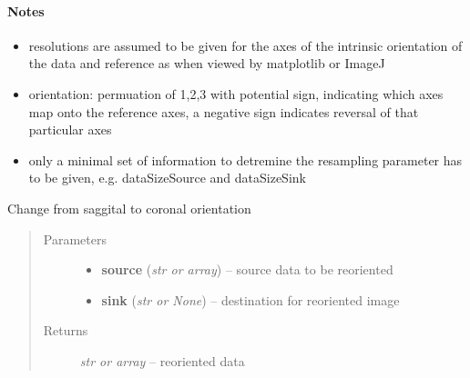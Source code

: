 \documentclass[letterpaper,10pt,english]{sphinxmanual}
\begin{document}
\begin{fulllineitems}
\paragraph{Notes}
\begin{itemize}
\item {} 
resolutions are assumed to be given for the axes of the intrinsic
orientation of the data and reference as when viewed by matplotlib or ImageJ

\item {} 
orientation: permuation of 1,2,3 with potential sign, indicating which
axes map onto the reference axes, a negative sign indicates reversal
of that particular axes

\item {} 
only a minimal set of information to detremine the resampling parameter
has to be given, e.g. dataSizeSource and dataSizeSink

\end{itemize}

\end{fulllineitems}


\begin{fulllineitems}
\label{api/ClearMap.Alignment:ClearMap.Alignment.Resampling.sagittalToCoronalData}
Change from saggital to coronal orientation
\begin{quote}\begin{description}
\item[{Parameters}] \leavevmode\begin{itemize}
\item {} 
\textbf{source} (\emph{str or array}) --
source data to be reoriented

\item {} 
\textbf{sink} (\emph{str or None}) --
destination for reoriented image

\end{itemize}

\item[{Returns}] \leavevmode
\emph{str or array} --
reoriented data

\end{description}\end{quote}

\end{fulllineitems}
\end{document}

